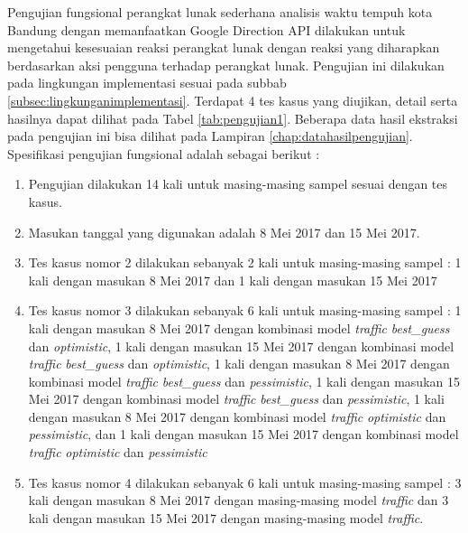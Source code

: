 Pengujian fungsional perangkat lunak sederhana analisis waktu tempuh kota Bandung dengan memanfaatkan Google Direction API dilakukan untuk mengetahui kesesuaian reaksi perangkat lunak dengan reaksi yang diharapkan berdasarkan aksi pengguna terhadap perangkat lunak. Pengujian ini dilakukan pada lingkungan implementasi sesuai pada subbab \ref{subsec:lingkunganimplementasi}. Terdapat 4 tes kasus yang diujikan, detail serta hasilnya dapat dilihat pada Tabel \ref{tab:pengujian1}. Beberapa data hasil ekstraksi pada pengujian ini bisa dilihat pada Lampiran \ref{chap:datahasilpengujian}. Spesifikasi pengujian fungsional adalah sebagai berikut :
\begin{enumerate}
	\item Pengujian dilakukan 14 kali untuk masing-masing sampel sesuai dengan tes kasus.
	\item Masukan tanggal yang digunakan adalah 8 Mei 2017 dan 15 Mei 2017.
	\item Tes kasus nomor 2 dilakukan sebanyak 2 kali untuk masing-masing sampel : 1 kali dengan masukan 8 Mei 2017 dan 1 kali dengan masukan 15 Mei 2017
	\item Tes kasus nomor 3 dilakukan sebanyak 6 kali untuk masing-masing sampel : 1 kali dengan masukan 8 Mei 2017 dengan kombinasi model \textit{traffic} \textit{best\_guess} dan \textit{optimistic}, 1 kali dengan masukan 15 Mei 2017 dengan kombinasi model \textit{traffic} \textit{best\_guess} dan \textit{optimistic}, 1 kali dengan masukan 8 Mei 2017 dengan kombinasi model \textit{traffic} \textit{best\_guess} dan \textit{pessimistic}, 1 kali dengan masukan 15 Mei 2017 dengan kombinasi model \textit{traffic} \textit{best\_guess} dan \textit{pessimistic}, 1 kali dengan masukan 8 Mei 2017 dengan kombinasi model \textit{traffic} \textit{optimistic} dan \textit{pessimistic}, dan 1 kali dengan masukan 15 Mei 2017 dengan kombinasi model \textit{traffic} \textit{optimistic} dan \textit{pessimistic}
	\item Tes kasus nomor 4 dilakukan sebanyak 6 kali untuk masing-masing sampel : 3 kali dengan masukan 8 Mei 2017 dengan masing-masing model \textit{traffic} dan 3 kali dengan masukan 15 Mei 2017 dengan masing-masing model \textit{traffic}.
\end{enumerate}


